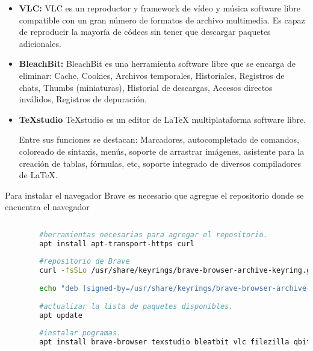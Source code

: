 \begin{itemize}
			\item \textbf{VLC:} VLC es un reproductor y framework de vídeo y música software libre compatible con un gran número de formatos de archivo multimedia. Es capaz de reproducir la mayoría de códecs sin tener que descargar paquetes adicionales.
		
			\item \textbf{BleachBit:} BleachBit es una herramienta software libre que se encarga de eliminar:
			Cache, Cookies, Archivos temporales, Historiales, Registros de chats, Thumbs (miniaturas), Historial de descargas, Accesos directos inválidos, Registros de depuración.
		
			\item \textbf{TeXstudio} TeXstudio es un editor de \LaTeX{} multiplataforma software libre.\par
			
			Entre sus funciones se destacan: Marcadores, autocompletado de comandos, coloreado de sintaxis, menús, soporte de arrastrar imágenes, asistente para la creación de tablas, fórmulas, etc, soporte integrado de diversos compiladores de \LaTeX{}.\par
			
		
		\end{itemize}
		
		Para instalar el navegador Brave es necesario que agregue el repositorio donde se encuentra el navegador
		
		\vspace{0.3cm}
			
		\begin{lstlisting}[language=Bash, caption=Instalación de programas]	
	
		#herramientas necesarias para agregar el repositorio.
		apt install apt-transport-https curl
		
		#repositorio de Brave
		curl -fsSLo /usr/share/keyrings/brave-browser-archive-keyring.gpg https://brave-browser-apt-release.s3.brave.com/brave-browser-archive-keyring.gpg
	
		echo "deb [signed-by=/usr/share/keyrings/brave-browser-archive-keyring.gpg arch=amd64] 		https://brave-browser-apt-release.s3.brave.com/ stable main"| tee /etc/apt/sources.list.d/brave-browser-release.list
		
		#actualizar la lista de paquetes disponibles.
		apt update
		
		#instalar pogramas.
		apt install brave-browser texstudio bleatbit vlc filezilla qbittorrent handbrake inkscape gimp evince thunderbird chromium
		
			
		\end{lstlisting}